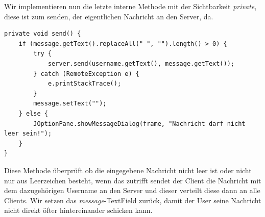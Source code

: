 
Wir implementieren nun die letzte interne Methode mit der Sichtbarkeit \textit{private}, diese ist zum senden, der eigentlichen Nachricht an den Server, da.
\begin{lstlisting}
private void send() {
	if (message.getText().replaceAll(" ", "").length() > 0) {
		try {
			server.send(username.getText(), message.getText());
		} catch (RemoteException e) {
			e.printStackTrace();
		}
		message.setText("");
	} else {
		JOptionPane.showMessageDialog(frame, "Nachricht darf nicht leer sein!");
	}
}
\end{lstlisting}
Diese Methode überprüft ob die eingegebene Nachricht nicht leer ist oder nicht nur aus Leerzeichen besteht, wenn das zutrifft sendet der Client die Nachricht mit dem dazugehörigen Username an den Server und dieser verteilt diese dann an alle Clients. Wir setzen das \textit{message}-TextField zurück, damit der User seine Nachricht nicht direkt öfter hintereinander schicken kann.


